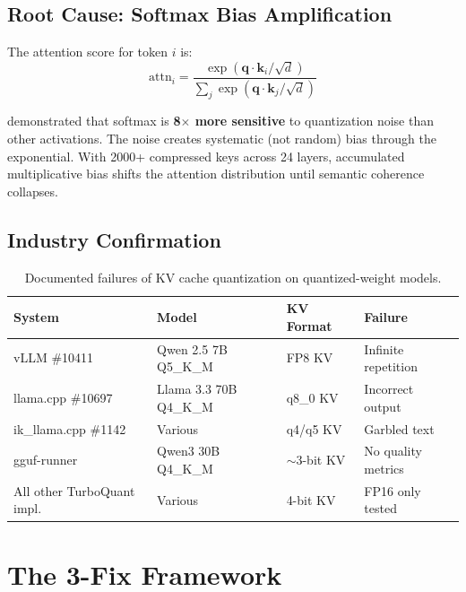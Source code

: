 \documentclass[11pt]{article}
\begin{document}
\subsection{Root Cause: Softmax Bias Amplification}

The attention score for token $i$ is:
\begin{equation}
    \text{attn}_i = \frac{\exp(\mathbf{q} \cdot \mathbf{k}_i / \sqrt{d})}{\sum_j \exp(\mathbf{q} \cdot \mathbf{k}_j / \sqrt{d})}
\end{equation}

\citet{bondarenko2023softmax} demonstrated that softmax is \textbf{8$\times$ more sensitive} to quantization noise than other activations. The noise creates systematic (not random) bias through the exponential. With 2000+ compressed keys across 24 layers, accumulated multiplicative bias shifts the attention distribution until semantic coherence collapses.

\subsection{Industry Confirmation}

\begin{table}[h]
\centering
\caption{Documented failures of KV cache quantization on quantized-weight models.}
\label{tab:failures}
\begin{tabular}{@{}llll@{}}
\toprule
System & Model & KV Format & Failure \\
\midrule
vLLM \#10411 & Qwen 2.5 7B Q5\_K\_M & FP8 KV & Infinite repetition \\
llama.cpp \#10697 & Llama 3.3 70B Q4\_K\_M & q8\_0 KV & Incorrect output \\
ik\_llama.cpp \#1142 & Various & q4/q5 KV & Garbled text \\
gguf-runner~\citep{jens2026ggufrunner} & Qwen3 30B Q4\_K\_M & $\sim$3-bit KV & No quality metrics \\
All other TurboQuant impl. & Various & 4-bit KV & FP16 only tested \\
\bottomrule
\end{tabular}
\end{table}

\section{The 3-Fix Framework}
\label{sec:3fix}
\end{document}
